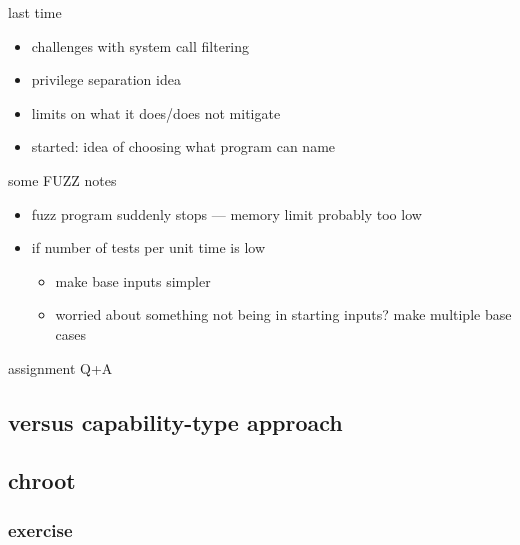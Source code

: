 \date{}
\title{}
\date{}
\usepackage[outputdir=latex.out]{minted}

\begin{frame}
    \titlepage
\end{frame}



\begin{frame}{last time}
    \begin{itemize}
    \item challenges with system call filtering
    \vspace{.5cm}
    \item privilege separation idea
    \item limits on what it does/does not mitigate
    \vspace{.5cm}
    \item started: idea of choosing what program can name
    \end{itemize}
\end{frame}

\begin{frame}{some FUZZ notes}
    \begin{itemize}
    \item fuzz program suddenly stops --- memory limit probably too low
    \item if number of tests per unit time is low
        \begin{itemize}
        \item make base inputs simpler
        \item worried about something not being in starting inputs? make multiple base cases
        \end{itemize}
    \end{itemize}
\end{frame}

\begin{frame}{assignment Q+A}
\end{frame}

\subsection{versus capability-type approach}


\subsection{chroot}


\subsubsection{exercise}


